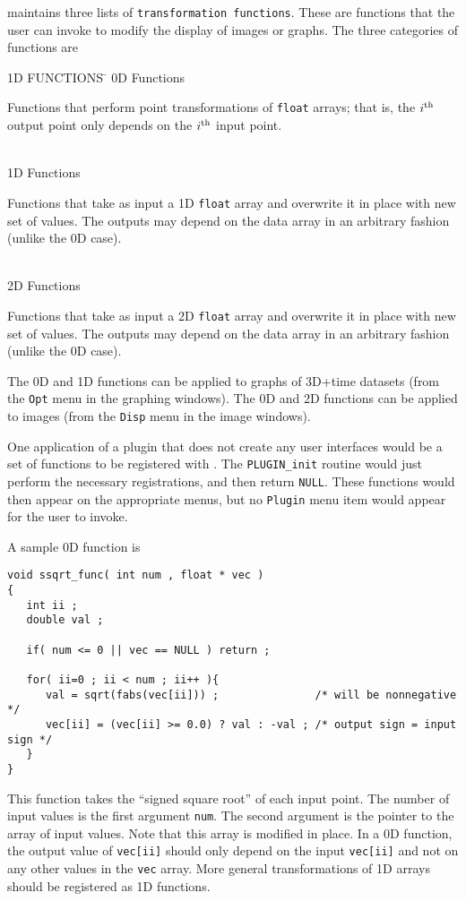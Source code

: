 \afnit maintains three lists of {\tt transformation functions}.
These are functions that the user can invoke to modify the display
of images or graphs.  The three categories of functions are
\begin{tabbing}
  \blob 1D FUNCTIONS \= \kill
%
  \blob 0D Functions \> \parbox[t]{4.9in}{
                          Functions that perform point transformations
                          of {\tt float} arrays; that is, the $i^{\rm th}$ output
                          point only depends on the $i^{\rm th}$ input point.} \\[.9ex]
%
  \blob 1D Functions \> \parbox[t]{4.9in}{
                          Functions that take as input a 1D {\tt float}
                          array and overwrite it in place with new
                          set of values.  The outputs may depend on the
                          data array in an arbitrary fashion (unlike the 0D case).} \\[.9ex]
%
  \blob 2D Functions \> \parbox[t]{4.9in}{
                          Functions that take as input a 2D {\tt float}
                          array and overwrite it in place with new
                          set of values.  The outputs may depend on the
                          data array in an arbitrary fashion (unlike the 0D case).}
\end{tabbing}
The 0D and 1D functions can be applied to graphs of 3D+time datasets
(from the {\tt Opt} menu in the graphing windows).
The 0D and 2D functions can be applied to images (from the {\tt Disp} menu in
the image windows).

One application of a plugin that does not create any user interfaces
would be a set of functions to be registered with \afni.  The {\tt PLUGIN\_init}
routine would just perform the necessary registrations, and then
return {\tt NULL}.  These functions would then appear on the appropriate
menus, but no {\tt Plugin} menu item would appear for the user to invoke.

A sample 0D function is
\begin{samepage}\begin{verbatim}
void ssqrt_func( int num , float * vec )
{
   int ii ;
   double val ;

   if( num <= 0 || vec == NULL ) return ;

   for( ii=0 ; ii < num ; ii++ ){
      val = sqrt(fabs(vec[ii])) ;               /* will be nonnegative */
      vec[ii] = (vec[ii] >= 0.0) ? val : -val ; /* output sign = input sign */
   }
}
\end{verbatim}\end{samepage}
This function takes the ``signed square root'' of each input point.
The number of input values is the first argument {\tt num}.  The
second argument is the pointer to the array of input values.
Note that this array is modified in place.  In a 0D function,
the output value of {\tt vec[ii]} should only depend on the input
{\tt vec[ii]} and not on any other values in the {\tt vec} array.
More general transformations of 1D arrays should be registered
as 1D functions.

